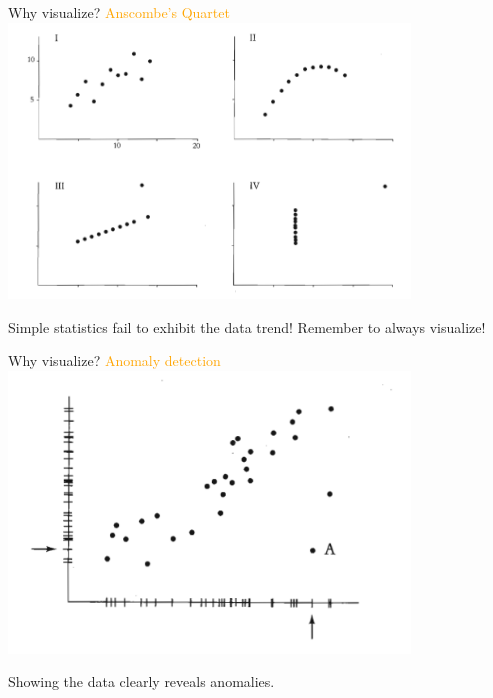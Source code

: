 \documentclass[
  ignorenonframetext,
]{beamer}
\begin{document}
\begin{frame}{Why visualize? \textcolor{orange}{Anscombe's Quartet}}
\protect\hypertarget{why-visualize-1}{}
\includegraphics[width=0.8\textwidth,height=\textheight]{excellence_figs/fig_2.png}

Simple statistics fail to exhibit the data trend! Remember to always
visualize!
\end{frame}

\begin{frame}{Why visualize? \textcolor{orange}{Anomaly detection}}
\protect\hypertarget{why-visualize-2}{}
\includegraphics[width=0.8\textwidth,height=\textheight]{excellence_figs/fig_3.png}

Showing the data clearly reveals anomalies.
\end{frame}
\end{document}
